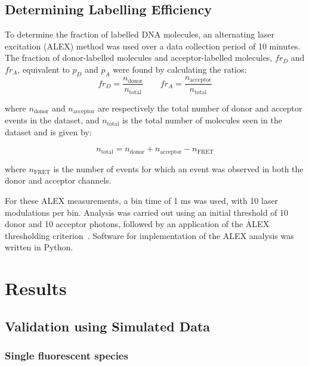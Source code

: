 \subsection*{Determining Labelling Efficiency}
To determine the fraction of labelled DNA molecules, an alternating laser excitation (ALEX) method was used over a data collection period of 10 minutes. The fraction of donor-labelled molecules and acceptor-labelled molecules, $fr_D$ and $fr_A$, equivalent to $p_D$ and $p_A$ were found by calculating the ratios:
\begin{equation}
fr_D = \frac{n_{\text{donor}}}{n_{\text{total}}} \qquad fr_A = \frac{n_{\text{acceptor}}}{n_{\text{total}}}
\label{eq:label}
\end{equation}

where $n_{\text{donor}}$ and $n_{\text{acceptor}}$ are respectively the total number of donor and acceptor events in the dataset, and $n_{\text{total}}$ is the total number of molecules seen in the dataset and is given by:
 
\begin{equation}
n_{\text{total}} = n_{\text{donor}} + n_{\text{acceptor}} - n_{\text{FRET}}
\label{eq:total_events}
\end{equation}

where $n_{\text{FRET}}$ is the number of events for which an event was observed in both the donor and acceptor channels. 

For these ALEX measurements, a bin time of 1 ms was used, with 10 laser modulations per bin. Analysis was carried out using an initial threshold of 10 donor and 10 acceptor photons, followed by an application of the ALEX thresholding criterion~\cite{kapanidis05}. Software for implementation of the ALEX analysis was written in Python.


\section{Results}
\subsection*{Validation using Simulated Data}
\subsubsection*{Single fluorescent species}


